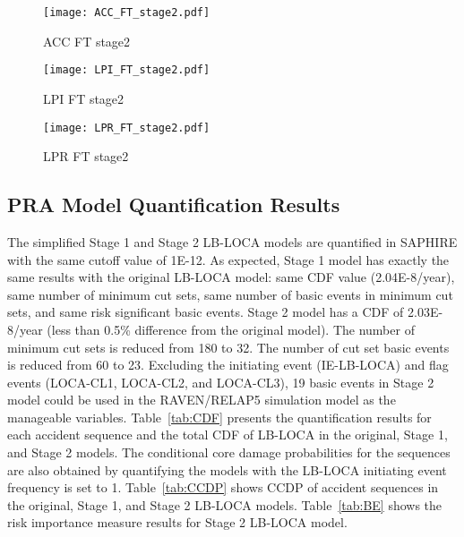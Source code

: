\begin{figure}
    \centering
    \texttt{[image: ACC\_FT\_stage2.pdf]}
    \caption{ACC FT stage2}
    \label{fig:ACC_FT_stage2}
\end{figure} 

\begin{figure}
    \centering
    \texttt{[image: LPI\_FT\_stage2.pdf]}
    \caption{LPI FT stage2}
    \label{fig:LPI_FT_stage2}
\end{figure} 

\begin{figure}
    \centering
    \texttt{[image: LPR\_FT\_stage2.pdf]}
    \caption{LPR FT stage2}
    \label{fig:LPR_FT_stage2}
\end{figure} 

\subsection{PRA Model Quantification Results}

The simplified Stage 1 and Stage 2 LB-LOCA models are quantified in SAPHIRE with the same cutoff value of 1E-12. As expected, Stage 1 model has exactly the same results with the original LB-LOCA model: same CDF value (2.04E-8/year), same number of minimum cut sets, same number of basic events in minimum cut sets, and same risk significant basic events.
Stage 2 model has a CDF of 2.03E-8/year (less than 0.5\% difference from the original model). The number of minimum cut sets is reduced from 180 to 32. The number of cut set basic events is reduced from 60 to 23. Excluding the initiating event (IE-LB-LOCA) and flag events (LOCA-CL1, LOCA-CL2, and LOCA-CL3), 19 basic events in Stage 2 model could be used in the RAVEN/RELAP5 simulation model as the manageable variables. Table~\ref{tab:CDF} presents the quantification results for each accident sequence and the total CDF of LB-LOCA in the original, Stage 1, and Stage 2 models. The conditional core damage probabilities for the sequences are also obtained by quantifying the models with the LB-LOCA initiating event frequency is set to 1. Table~\ref{tab:CCDP} shows CCDP of accident sequences in the original, Stage 1, and Stage 2 LB-LOCA models. Table~\ref{tab:BE} shows the risk importance measure results for Stage 2 LB-LOCA model. 

